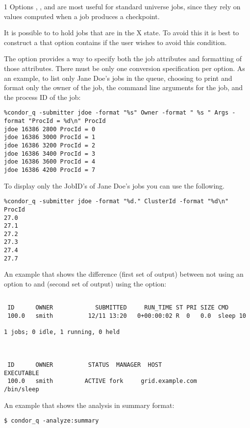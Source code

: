 \begin{ManPage}{\label{man-condor-q}}{1}
Options
, , and  are most useful for standard
universe jobs, since they rely on values computed when a job
produces a checkpoint.

It is possible to to hold jobs that are in the X state.
To avoid this it 
is best to construct a  that option contains
 if the user wishes to avoid this condition. 

\Examples

The  option provides a way to specify both the job attributes
and formatting of those attributes.
There must be only one conversion specification per  option.
As an example, to list only Jane Doe's jobs in the queue,
choosing to print and format only the owner of the job,
the command line arguments for the job, and the
process ID of the job:
\footnotesize
\begin{verbatim}
%condor_q -submitter jdoe -format "%s" Owner -format " %s " Args -format "ProcId = %d\n" ProcId
jdoe 16386 2800 ProcId = 0
jdoe 16386 3000 ProcId = 1
jdoe 16386 3200 ProcId = 2
jdoe 16386 3400 ProcId = 3
jdoe 16386 3600 ProcId = 4
jdoe 16386 4200 ProcId = 7
\end{verbatim}
\normalsize

To display only the JobID's of Jane Doe's jobs you can use the following.
\footnotesize
\begin{verbatim}
%condor_q -submitter jdoe -format "%d." ClusterId -format "%d\n" ProcId
27.0
27.1
27.2
27.3
27.4
27.7
\end{verbatim}
\normalsize

An example that shows the difference (first set of output)
between not using an option to  and (second
set of output) using the  option:
\footnotesize
\begin{verbatim}

 ID      OWNER            SUBMITTED     RUN_TIME ST PRI SIZE CMD
 100.0   smith          12/11 13:20   0+00:00:02 R  0   0.0  sleep 10

1 jobs; 0 idle, 1 running, 0 held



 ID      OWNER          STATUS  MANAGER  HOST                EXECUTABLE
 100.0   smith         ACTIVE fork     grid.example.com       /bin/sleep
\end{verbatim}
\normalsize

An example that shows the analysis in summary format:
\footnotesize
\begin{verbatim}
$ condor_q -analyze:summary


\end{verbatim}
\end{ManPage}
